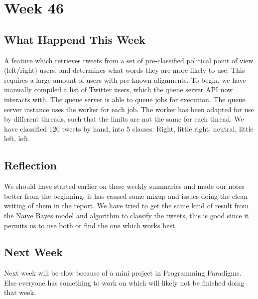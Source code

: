 \section*{Week 46} \subsection*{What Happend This Week} 
A feature which retrieves tweets from a set of pre-classified political point of
view (left/right) users, and determines what words they are more likely to use.
This requires a large amount of users with pre-known alignments. To begin, we
have manually compiled a list of Twitter users, which the queue server \ac{API}
now interacts with. The queue server is able to queue jobs for execution. The
queue server instance uses the worker for each job. The worker has been adapted
for use by different threads, such that the limits are not the same for each
thread. We have classified 120 tweets by hand, into 5 classes: Right, little
right, neutral, little left, left.


\subsection*{Reflection} 
We should have started earlier on these weekly summaries and made our notes
better from the beginning, it has caused some mixup and issues doing the clean
writing of them in the report. We have tried to get the same kind of result from
the Naïve Bayes model and algorithm to classify the tweets, this is good since
it permits us to use both or find the one which works best.


\subsection*{Next Week} 
Next week will be slow because of a mini project in Programming Paradigms. Else
everyone has something to work on which will likely not be finished doing that
week.



